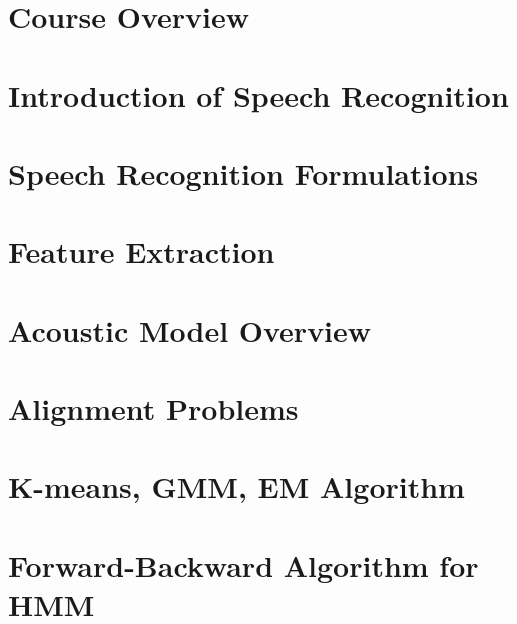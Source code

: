 \documentclass[a4paper]{article}
\begin{document}
\section{Course Overview}


\section{Introduction of Speech Recognition}


\section{Speech Recognition Formulations}


\section{Feature Extraction}


\section{Acoustic Model Overview}


\section{Alignment Problems}


\section{K-means, GMM, EM Algorithm}


\section{Forward-Backward Algorithm for HMM}

\end{document}
